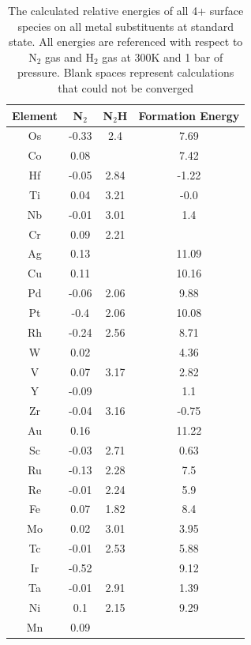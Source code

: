 \documentclass[journal=jacsat,manuscript=article]{achemso}
\begin{document}
\begin{table}
\begin{center}
\begin{tabular}{| c | c | c | c |}
\hline
Element & N$_2$ & N$_2$H & Formation Energy \\
\hline
Os & -0.33 & 2.4 & 7.69 \\
Co & 0.08 &  & 7.42 \\
Hf & -0.05 & 2.84 & -1.22 \\
Ti & 0.04 & 3.21 & -0.0 \\
Nb & -0.01 & 3.01 & 1.4 \\
Cr & 0.09 & 2.21 &  \\
Ag & 0.13 &  & 11.09 \\
Cu & 0.11 &  & 10.16 \\
Pd & -0.06 & 2.06 & 9.88 \\
Pt & -0.4 & 2.06 & 10.08 \\
Rh & -0.24 & 2.56 & 8.71 \\
W & 0.02 &  & 4.36 \\
V & 0.07 & 3.17 & 2.82 \\
Y & -0.09 &  & 1.1 \\
Zr & -0.04 & 3.16 & -0.75 \\
Au & 0.16 &  & 11.22 \\
Sc & -0.03 & 2.71 & 0.63 \\
Ru & -0.13 & 2.28 & 7.5 \\
Re & -0.01 & 2.24 & 5.9 \\
Fe & 0.07 & 1.82 & 8.4 \\
Mo & 0.02 & 3.01 & 3.95 \\
Tc & -0.01 & 2.53 & 5.88 \\
Ir & -0.52 &  & 9.12 \\
Ta & -0.01 & 2.91 & 1.39 \\
Ni & 0.1 & 2.15 & 9.29 \\
Mn & 0.09 &  &  \\
\hline
\end{tabular}
\end{center}
\label{table:4+_energies}
\caption{The calculated relative energies of all 4+ surface species on all metal substituents at standard state. All energies are referenced with respect to N$_2$ gas and H$_2$ gas at 300K and 1 bar of pressure. Blank spaces represent calculations that could not be converged}
\end{table}
\end{document}
